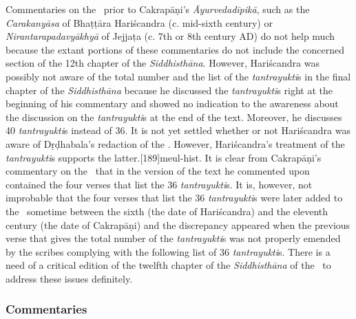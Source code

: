 Commentaries on the \CS\ prior to Cakrapāṇi's \emph{Āyurvedadīpikā}, such as 
the 
\emph{Carakanyāsa} of Bhaṭṭāra Hariścandra (c. mid-sixth century) or 
\emph{Nirantarapadavyākhyā} of Jejjaṭa (c. 7th or 8th century AD) do not help 
much because the extant portions of these commentaries do not include the 
concerned section of the 12th chapter of the \emph{Siddhisthāna}. However, 
Hariścandra was possibly not aware of the total 
number and the list of the \emph{tantrayukti}s in the final chapter of the 
\emph{Siddhisthāna} because he discussed the \emph{tantrayukti}s right at 
the 
beginning of his commentary and showed no indication to the awareness about 
the 
discussion on the \emph{tantrayukti}s at the end of the text. Moreover, he 
discusses 40 \emph{tantrayukti}s instead of 36. It is not yet settled whether or 
not 
Hariścandra was aware of Dṛḍhabala's redaction of the \CS. However, 
Hariścandra's 
treatment of the \emph{tantrayukti}s supports the 
latter.[189]{meul-hist}.  It 
is clear from Cakrapāṇi's commentary on the \CS\ that in the version of the text 
he 
commented upon contained the four verses that list the 36 \emph{tantrayukti}s. 
It 
is, however, not improbable that the four verses that list the 36 
\emph{tantrayukti}s were later added to the \CS\ sometime between the sixth 
(the 
date of Hariścandra) and the eleventh century (the date of Cakrapāṇi) and the 
discrepancy appeared when the previous verse that gives the total number of the 
\emph{tantrayukti}s was not properly emended by the scribes complying with 
the 
following list of 36 \emph{tantrayukti}s. There is a need of a critical edition of 
the 
twelfth chapter of the \emph{Siddhisthāna} of the \CS\ to address these issues 
definitely.  

\subsubsection{Commentaries}\label{commentaries}

